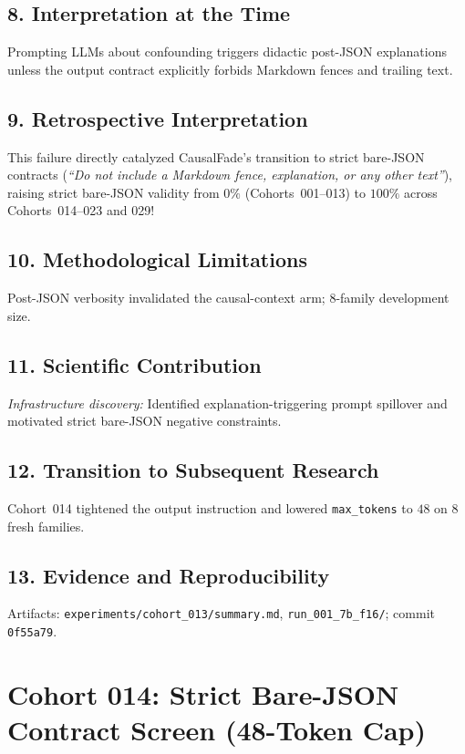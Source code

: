 \subsection*{8. Interpretation at the Time}
Prompting LLMs about confounding triggers didactic post-JSON explanations unless the output contract explicitly forbids Markdown fences and trailing text.

\subsection*{9. Retrospective Interpretation}
This failure directly catalyzed CausalFade's transition to strict bare-JSON contracts (\emph{``Do not include a Markdown fence, explanation, or any other text''}), raising strict bare-JSON validity from $0\%$ (Cohorts~001--013) to \textbf{$100\%$} across Cohorts~014--023 and 029!

\subsection*{10. Methodological Limitations}
Post-JSON verbosity invalidated the causal-context arm; 8-family development size.

\subsection*{11. Scientific Contribution}
\emph{Infrastructure discovery:} Identified explanation-triggering prompt spillover and motivated strict bare-JSON negative constraints.

\subsection*{12. Transition to Subsequent Research}
Cohort~014 tightened the output instruction and lowered \texttt{max\_tokens} to $48$ on $8$ fresh families.

\subsection*{13. Evidence and Reproducibility}
Artifacts: \texttt{experiments/cohort\_013/summary.md}, \texttt{run\_001\_7b\_f16/}; commit \texttt{0f55a79}.

\section{Cohort 014: Strict Bare-JSON Contract Screen (48-Token Cap)}

